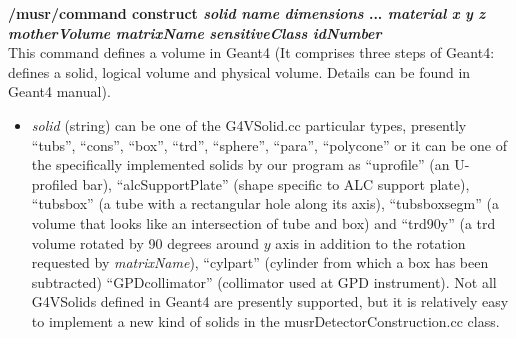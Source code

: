 \documentclass[twoside]{dis04}
\begin{document}
\begin{description}

\item{\bf /musr/command construct \emph{solid} \emph{name} \emph{dimensions} ... \emph{material} 
	\emph{x} \emph{y} \emph{z} \emph{motherVolume} \emph{matrixName} 
	\emph{sensitiveClass} \emph{idNumber} }\\
	This command defines a volume in {\sc Geant4} (It comprises three steps of {\sc Geant4}: defines a solid,
        logical volume and physical volume.  Details can be found in {\sc Geant4} manual). \\
	\begin{itemize}
	\item \emph{solid} (string) can be one of the G4VSolid.cc particular types, presently ``tubs'', ``cons'',
	             ``box'', ``trd'', ``sphere'', ``para'', ``polycone''
	             or it can be one of the specifically implemented solids by our program as ``uprofile'' 
	             (an U-profiled bar), ``alcSupportPlate'' (shape specific to ALC support plate), ``tubsbox'' 
	             (a tube with a rectangular hole along its axis), ``tubsboxsegm'' 
	             (a volume that looks like an intersection of tube and box) and 
                     ``trd90y'' (a trd volume rotated by 90 degrees around $y$ axis in addition
                     to the rotation requested by \emph{matrixName}), 
		     ``cylpart'' (cylinder from which a box has been subtracted)
		     ``GPDcollimator'' (collimator used at GPD instrument).  Not all G4VSolids defined
		     in Geant4 are
                     presently supported, but it is relatively easy to implement a new kind of solids
                     in the musrDetectorConstruction.cc class.
		     

\end{itemize}
\end{description}
\end{document}
